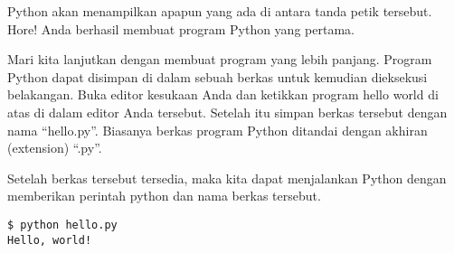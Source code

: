 Python akan menampilkan apapun yang ada di antara tanda petik tersebut. Hore!
Anda berhasil membuat program Python yang pertama.

Mari kita lanjutkan dengan membuat program yang lebih panjang. Program Python
dapat disimpan di dalam sebuah berkas untuk kemudian dieksekusi belakangan.
Buka editor kesukaan Anda dan ketikkan program hello world di atas di dalam
editor Anda tersebut. Setelah itu simpan berkas tersebut dengan nama
``hello.py''. Biasanya berkas program Python ditandai dengan akhiran
(extension) ``.py''.

Setelah berkas tersebut tersedia, maka kita dapat menjalankan Python dengan
memberikan perintah python dan nama berkas tersebut.

\begin{verbatim}
$ python hello.py
Hello, world!
\end{verbatim}

